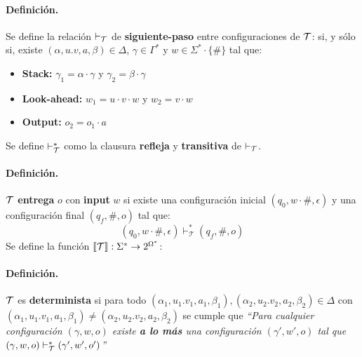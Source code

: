 \paragraph{Definición.} Se define la relación $\vdash_{\mathcal{T}}$ de \textbf{siguiente-paso} entre configuraciones de $\mathcal{T}$:
si, y sólo si, existe $(\alpha,u.v,a,\beta) \in \Delta$, $\gamma \in \Gamma^*$ y $w \in \Sigma^* \cdot \{\#\}$ tal que:
\begin{itemize}
    \item \textbf{Stack:} $\gamma_1 = \alpha \cdot \gamma$ y $\gamma_2 = \beta \cdot \gamma$
    \item \textbf{Look-ahead:} $w_1 = u \cdot v \cdot w$ y $w_2 = v \cdot w$
    \item \textbf{Output:} $o_2 = o_1 \cdot a$
\end{itemize}
Se define $\vdash_{\mathcal{T}}^*$ como la clausura \textbf{refleja} y \textbf{transitiva} de $\vdash_{\mathcal{T}}$.

\paragraph{Definición.} $\mathcal{T}$ \textbf{entrega} $o$ con \textbf{input} $w$ si existe una configuración inicial $(q_0, w\cdot \#, \epsilon)$ y una configuración final $(q_f, \#, o)$ tal que:
$$
    \left(q_0, w \cdot \#, \epsilon\right) \vdash_{\mathcal{T}}^*\left(q_f, \#, o\right)
$$
Se define la función $\llbracket \mathcal{T} \rrbracket: \Sigma^* \to 2^{\Omega^*}$:

\paragraph{Definición.} $\mathcal{T}$ es \textbf{determinista} si para todo $\left(\alpha_1, u_1.v_1, a_1, \beta_1\right),\left(\alpha_2, u_2.v_2, a_2, \beta_2\right) \in \Delta$ con \\
$\left(\alpha_1, u_1.v_1, a_1, \beta_1\right) \neq\left(\alpha_2, u_2.v_2, a_2, \beta_2\right)$ se cumple que
\textit{``Para cualquier configuración $(\gamma, w, o)$ existe \textbf{a lo más} una configuración $(\gamma', w', o)$ tal que $(\gamma,w,o) \vdash_{\mathcal{T}}^* (\gamma',w', o')$''} \medbreak

